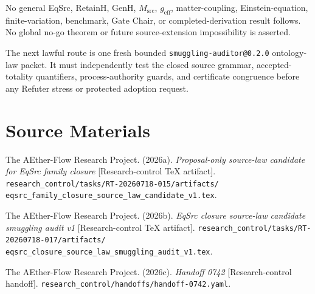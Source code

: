 \documentclass[11pt]{article}
\begin{document}
No general EqSrc, RetainH, GenH, \(M_{\mathrm{src}}\),
\(g_{\mathrm{eff}}\), matter-coupling, Einstein-equation, finite-variation,
benchmark, Gate Chair, or completed-derivation result follows. No global
no-go theorem or future source-extension impossibility is asserted.

The next lawful route is one fresh bounded
\texttt{smuggling-auditor@0.2.0} ontology-law packet. It must independently
test the closed source grammar, accepted-totality quantifiers, process-authority
guards, and certificate congruence before any Refuter stress or protected
adoption request.

\section{Source Materials}

The AEther-Flow Research Project. (2026a). \emph{Proposal-only source-law
candidate for EqSrc family closure} [Research-control TeX artifact].
\texttt{research\_control/tasks/RT-20260718-015/artifacts/
eqsrc\_family\_closure\_source\_law\_candidate\_v1.tex}.

The AEther-Flow Research Project. (2026b). \emph{EqSrc closure source-law
candidate smuggling audit v1} [Research-control TeX artifact].
\texttt{research\_control/tasks/RT-20260718-017/artifacts/
eqsrc\_closure\_source\_law\_smuggling\_audit\_v1.tex}.

The AEther-Flow Research Project. (2026c). \emph{Handoff 0742}
[Research-control handoff].
\texttt{research\_control/handoffs/handoff-0742.yaml}.
\end{document}

